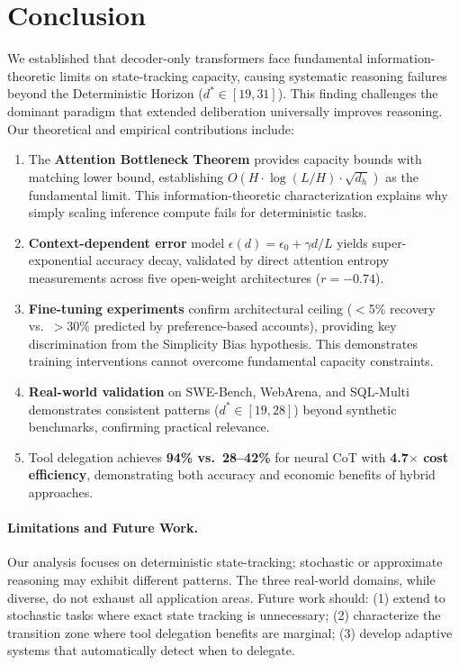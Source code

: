 \documentclass{article}
\theoremstyle{plain}
\theoremstyle{definition}
\theoremstyle{remark}
\begin{document}

\section{Conclusion}
\label{sec:conclusion}

We established that decoder-only transformers face fundamental information-theoretic limits on state-tracking capacity, causing systematic reasoning failures beyond the Deterministic Horizon ($d^* \in [19, 31]$). This finding challenges the dominant paradigm that extended deliberation universally improves reasoning. Our theoretical and empirical contributions include:

\begin{enumerate}[leftmargin=*,itemsep=1pt]
	\item The \textbf{Attention Bottleneck Theorem} provides capacity bounds with matching lower bound, establishing $O(H \cdot \log(L/H) \cdot \sqrt{d_h})$ as the fundamental limit. This information-theoretic characterization explains why simply scaling inference compute fails for deterministic tasks.
	\item \textbf{Context-dependent error} model $\epsilon(d) = \epsilon_0 + \gamma d/L$ yields super-exponential accuracy decay, validated by direct attention entropy measurements across five open-weight architectures ($r = -0.74$).
	\item \textbf{Fine-tuning experiments} confirm architectural ceiling ($<$5\% recovery vs.\ $>$30\% predicted by preference-based accounts), providing key discrimination from the Simplicity Bias hypothesis. This demonstrates training interventions cannot overcome fundamental capacity constraints.
	\item \textbf{Real-world validation} on SWE-Bench, WebArena, and SQL-Multi demonstrates consistent patterns ($d^* \in [19, 28]$) beyond synthetic benchmarks, confirming practical relevance.
	\item Tool delegation achieves \textbf{94\% vs.\ 28--42\%} for neural CoT with \textbf{4.7$\times$ cost efficiency}, demonstrating both accuracy and economic benefits of hybrid approaches.
\end{enumerate}

\paragraph{Limitations and Future Work.} Our analysis focuses on deterministic state-tracking; stochastic or approximate reasoning may exhibit different patterns. The three real-world domains, while diverse, do not exhaust all application areas. Future work should: (1) extend to stochastic tasks where exact state tracking is unnecessary; (2) characterize the transition zone where tool delegation benefits are marginal; (3) develop adaptive systems that automatically detect when to delegate.
\end{document}
